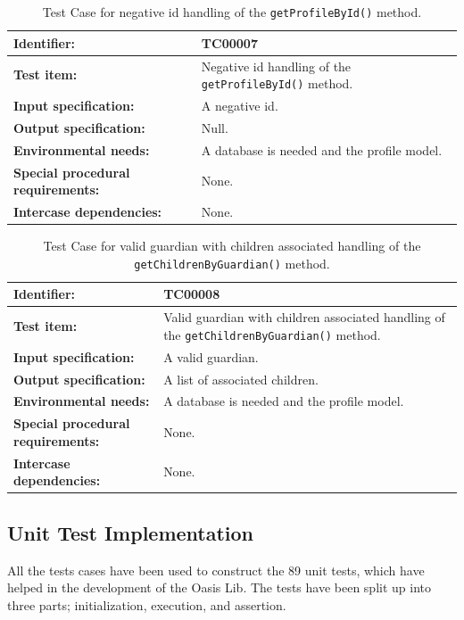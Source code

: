 \begin{table}[H]
	\centering
		\begin{tabular}{| p{4.5cm} | m{9cm} |}
			\hline
			\textbf{Identifier:} 					& TC00007 \\ \hline
			\textbf{Test item:}						& Negative id handling of the \texttt{getProfileById()} method. \\ \hline
			\textbf{Input specification:}			& A negative id. \\ \hline
			\textbf{Output specification:} 			& Null. \\ \hline
			\textbf{Environmental needs:}			& A database is needed and the profile model. \\ \hline
			\textbf{Special procedural requirements:}	& None. \\ \hline
			\textbf{Intercase dependencies:}			& None. \\ \hline
		\end{tabular}
	\caption{Test Case for negative id handling of the \texttt{getProfileById()} method.}
	\label{tab:TestCase_NegativeIdHandling}
\end{table}

\begin{table}[H]
	\centering
		\begin{tabular}{| p{4.5cm} | m{9cm} |}
			\hline
			\textbf{Identifier:} 					& TC00008 \\ \hline
			\textbf{Test item:}						& Valid guardian with children associated handling of the \texttt{getChildrenByGuardian()} method. \\ \hline
			\textbf{Input specification:}			& A valid guardian. \\ \hline
			\textbf{Output specification:} 			& A list of associated children. \\ \hline
			\textbf{Environmental needs:}			& A database is needed and the profile model. \\ \hline
			\textbf{Special procedural requirements:}	& None. \\ \hline
			\textbf{Intercase dependencies:}			& None. \\ \hline
		\end{tabular}
	\caption{Test Case for valid guardian with children associated handling of the \texttt{getChildrenByGuardian()} method.}
	\label{tab:TestCase_ValidGuardianWithChildrenAssociatedHandling}
\end{table}


\subsection{Unit Test Implementation}
All the tests cases have been used to construct the 89 unit tests, which have helped in the development of the Oasis Lib.
The tests have been split up into three parts; initialization, execution, and assertion.


